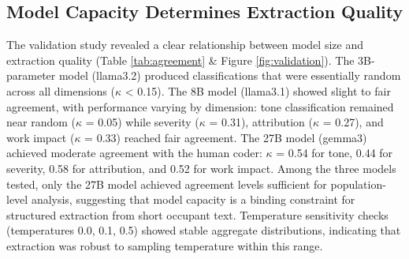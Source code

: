 \documentclass[sigconf]{acmart}
\begin{document}
\subsection{Model Capacity Determines Extraction Quality}
The validation study revealed a clear relationship between model size and extraction quality (Table \ref{tab:agreement} \& Figure \ref{fig:validation}). The 3B-parameter model (llama3.2) produced classifications that were essentially random across all dimensions ($\kappa$ < 0.15). The 8B model (llama3.1) showed slight to fair agreement, with performance varying by dimension: tone classification remained near random ($\kappa$ = 0.05) while severity ($\kappa$ = 0.31), attribution ($\kappa$ = 0.27), and work impact ($\kappa$ = 0.33) reached fair agreement. The 27B model (gemma3) achieved moderate agreement with the human coder: $\kappa$ = 0.54 for tone, 0.44 for severity, 0.58 for attribution, and 0.52 for work impact. Among the three models tested, only the 27B model achieved agreement levels sufficient for population-level analysis, suggesting that model capacity is a binding constraint for structured extraction from short occupant text. Temperature sensitivity checks (temperatures 0.0, 0.1, 0.5) showed stable aggregate distributions, indicating that extraction was robust to sampling temperature within this range.
\end{document}
